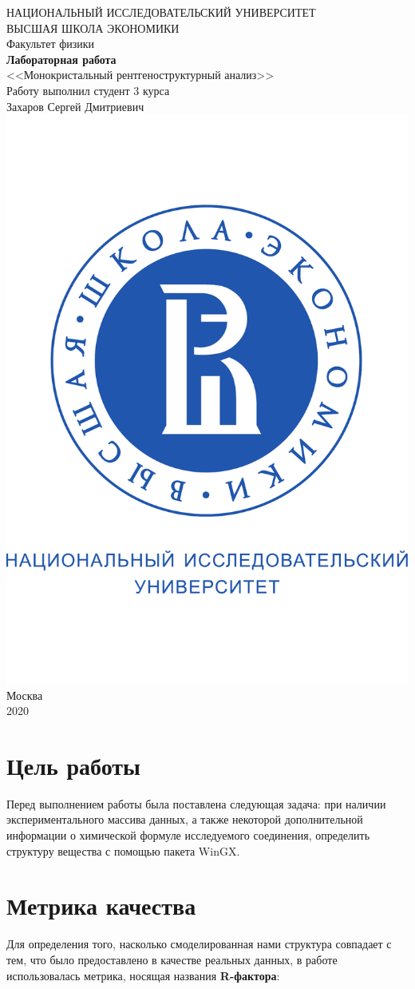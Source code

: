 \documentclass[a4paper, 12pt]{article}
\begin{document}
	\begin{titlepage}
		\begin{center}
			$$$$
			$$$$
			$$$$
			$$$$
			{\Large{НАЦИОНАЛЬНЫЙ ИССЛЕДОВАТЕЛЬСКИЙ УНИВЕРСИТЕТ}}\\
			\vspace{0.1cm}
			{\Large{ВЫСШАЯ ШКОЛА ЭКОНОМИКИ}}\\
			\vspace{0.25cm}
			{\large{Факультет физики}}\\
			\vspace{4cm}
			{\Huge\textbf{{Лабораторная работа}}}\\%
			\vspace{1cm}
			{\LARGE{<<Монокристальный рентгеноструктурный анализ>>}}\\%
			\vspace{2cm}
			{Работу выполнил студент 3 курса}\\
			{Захаров Сергей Дмитриевич}
			\vfill
			\includegraphics[width=0.2\linewidth]{HSElogo}
			\vfill
			Москва\\
			2020
		\end{center}
	\end{titlepage}

\tableofcontents

\newpage

\section{Цель работы}

Перед выполнением работы была поставлена следующая задача: при наличии экспериментального массива данных, а также некоторой дополнительной информации о химической формуле исследуемого соединения, определить структуру вещества с помощью пакета WinGX.

\section{Метрика качества}

Для определения того, насколько смоделированная нами структура совпадает с тем, что было предоставлено в качестве реальных данных, в работе использовалась метрика, носящая названия \textbf{R-фактора}:
\end{document}
